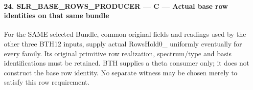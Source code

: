 \paragraph{24. SLR\_\allowbreak BASE\_\allowbreak ROWS\_\allowbreak PRODUCER — C — Actual base row identities on that same bundle}

For the SAME selected Bundle, common original fields and readings used by the other three BTH12 inputs, supply actual RowsHold0\_ uniformly eventually for every family. Its original primitive row realization, spectrum/type and basis identifications must be retained. BTH supplies a theta consumer only; it does not construct the base row identity. No separate witness may be chosen merely to satisfy this row requirement.


